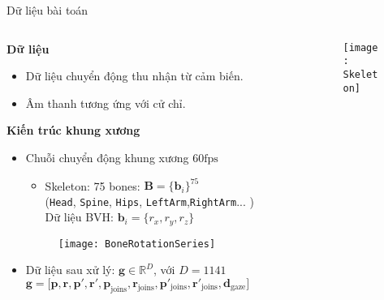 \begin{frame}{Dữ liệu bài toán}
	
	
	\begin{columns}
		
		\begin{column}{0.7\textwidth}
			
			\textbf{Dữ liệu}
			\begin{itemize}
				\item Dữ liệu chuyển động thu nhận từ cảm biến.
				\item Âm thanh tương ứng với cử chỉ.
			\end{itemize}
			
			\textbf{Kiến trúc khung xương}
			\begin{itemize}
				\item Chuỗi chuyển động khung xương $60 \text{fps}$
				\begin{itemize}
					\item Skeleton: 75 bones: $\mathbf{B} = \{ \mathbf{b}_i \}^{75} $ \\
					\small{(\texttt{Head}, \texttt{Spine}, \texttt{Hips}, \texttt{LeftArm},\texttt{RightArm}... )} \\
					Dữ liệu BVH: $\mathbf{b}_{i} = \{r_x, r_y, r_z\}$
				\end{itemize}
				\begin{figure}[h]
					\centering
					\texttt{[image: BoneRotationSeries]}
				\end{figure}
				
				\item Dữ liệu sau xử lý: $\mathbf{g} \in \mathbb{R}^{D}$, với $D=1141$ 
				$\mathbf{g} = \Big[ \mathbf{p},  \mathbf{r},
				\mathbf{ p }',  \mathbf{r}',
				\mathbf{p}_{\text{joins}},  \mathbf{r}_{\text{joins}},
				\mathbf{p}'_{\text{joins}},  \mathbf{r}'_{\text{joins}},
				\mathbf{d}_{\text{gaze}}
				\Big]$
			\end{itemize}
			\vspace{10pt}
		
		\end{column}
		
			\begin{column}{0.3\textwidth}
				\begin{figure}[h]
					\centering
					\texttt{[image: Skeleton]}
				\end{figure}
		\end{column}
		
	\end{columns}
	
\end{frame}

